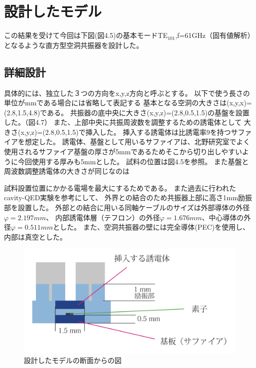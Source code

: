 \section{設計したモデル}
この結果を受けて今回は下図(図4.5)の基本モードTE$_{101}$,f=61GHz（固有値解析）となるような直方型空洞共振器を設計した。

\subsection*{詳細設計}
具体的には、独立した３つの方向をx,y,z方向と呼ぶとする。
以下で使う長さの単位がmmである場合には省略して表記する
基本となる空洞の大きさは(x,y,x)=(2.8,1.5,4.8)である。
共振器の底中央に大きさ(x,y,z)=(2.8,0.5,1.5)の基盤を設置した。（図4.7）
また、上部中央に共振周波数を調整するための誘電体として
大きさ(x,y,z)=(2.8,0.5,1.5)で挿入した。
挿入する誘電体は比誘電率9を持つサファイアを想定した。
誘電体、基盤として用いるサファイアは、北野研究室でよく使用されるサファイア基盤の厚さが5mmであるためそこから切り出しやすいように今回使用する厚みも5mmとした。
試料の位置は図4.5を参照。
また基盤と周波数調整誘電体の大きさが同じなのは

試料設置位置にかかる電場を最大にするためである。
また過去に行われたcavity-QED実験\cite{cQED}を参考にして、
外界との結合のため共振器上部に高さ1mm励振部を設置した。
外部との結合に用いる同軸ケーブルのサイズは外部導体の外径$φ=2.197mm$、
内部誘電体層（テフロン）の外径$φ=1.676mm$、中心導体の外径$φ=0.511mm$とした。
また、空洞共振器の壁には完全導体(PEC)を使用し、内部は真空とした。

\vspace{10 mm}

\begin{figure}[h]
  \begin{center}
    \includegraphics[width=12cm]{./image/newmodel.png}
    \caption{設計したモデルの断面からの図}
    \label{fig:Cavity}
  \end{center}
\end{figure}

